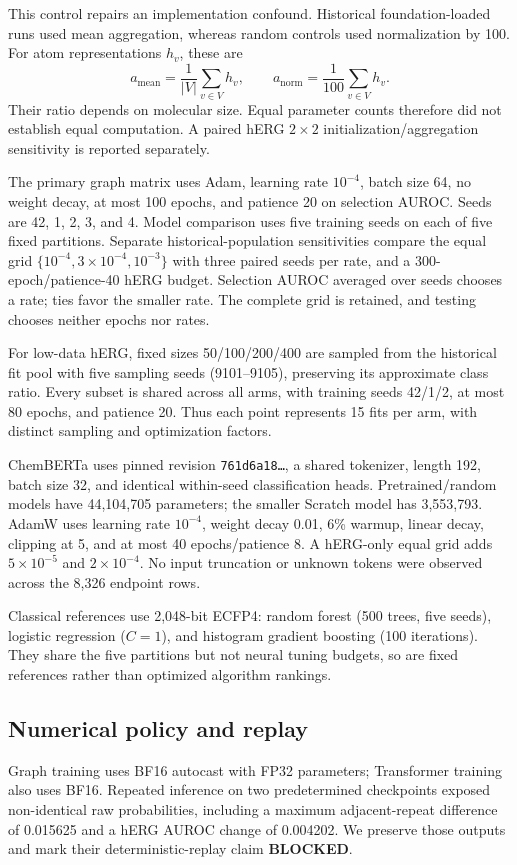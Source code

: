 \documentclass[runningheads,a4paper]{llncs}
\begin{document}
This control repairs an implementation confound. Historical foundation-loaded runs used mean aggregation, whereas random controls used normalization by 100. For atom representations $h_v$, these are
\begin{equation}
 a_{\mathrm{mean}}=\frac{1}{|V|}\sum_{v\in V}h_v,\qquad
 a_{\mathrm{norm}}=\frac{1}{100}\sum_{v\in V}h_v.
\end{equation}
Their ratio depends on molecular size. Equal parameter counts therefore did not establish equal computation. A paired hERG $2\times2$ initialization/aggregation sensitivity is reported separately.

The primary graph matrix uses Adam, learning rate $10^{-4}$, batch size 64, no weight decay, at most 100 epochs, and patience 20 on selection AUROC. Seeds are 42, 1, 2, 3, and 4. Model comparison uses five training seeds on each of five fixed partitions. Separate historical-population sensitivities compare the equal grid $\{10^{-4},3\times10^{-4},10^{-3}\}$ with three paired seeds per rate, and a 300-epoch/patience-40 hERG budget. Selection AUROC averaged over seeds chooses a rate; ties favor the smaller rate. The complete grid is retained, and testing chooses neither epochs nor rates.

For low-data hERG, fixed sizes 50/100/200/400 are sampled from the historical fit pool with five sampling seeds (9101--9105), preserving its approximate class ratio. Every subset is shared across all arms, with training seeds 42/1/2, at most 80 epochs, and patience 20. Thus each point represents 15 fits per arm, with distinct sampling and optimization factors.

ChemBERTa uses pinned revision \texttt{761d6a18\ldots}, a shared tokenizer, length 192, batch size 32, and identical within-seed classification heads. Pretrained/random models have 44,104,705 parameters; the smaller Scratch model has 3,553,793. AdamW uses learning rate $10^{-4}$, weight decay 0.01, 6\% warmup, linear decay, clipping at 5, and at most 40 epochs/patience 8. A hERG-only equal grid adds $5\times10^{-5}$ and $2\times10^{-4}$. No input truncation or unknown tokens were observed across the 8,326 endpoint rows.

Classical references use 2,048-bit ECFP4: random forest (500 trees, five seeds), logistic regression ($C=1$), and histogram gradient boosting (100 iterations). They share the five partitions but not neural tuning budgets, so are fixed references rather than optimized algorithm rankings.

\subsection{Numerical policy and replay}
Graph training uses BF16 autocast with FP32 parameters; Transformer training also uses BF16. Repeated inference on two predetermined checkpoints exposed non-identical raw probabilities, including a maximum adjacent-repeat difference of 0.015625 and a hERG AUROC change of 0.004202. We preserve those outputs and mark their deterministic-replay claim \textbf{BLOCKED}.
\end{document}
